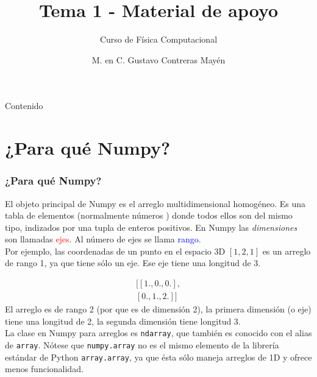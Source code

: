 \documentclass[12pt]{beamer}
\title{Tema 1 - Material de apoyo}
\subtitle{Curso de F\'{i}sica Computacional}
\author{M. en C. Gustavo Contreras May\'{e}n}
\begin{document}
\maketitle
\fontsize{14}{14}\selectfont
{}
\begin{frame}{Contenido}
\tableofcontents[pausesections]
\end{frame}
\section{¿Para qu\'{e} Numpy?}
\begin{frame}
\frametitle{¿Para qu\'{e} Numpy?}
El objeto principal de Numpy es el arreglo multidimensional homog\'{e}neo. Es una tabla de elementos (normalmente n\'{u}meros ) donde todos ellos son del mismo tipo, indizados por una tupla de enteros positivos. En Numpy las \textit{dimensiones} son llamadas \textcolor{red}{ejes}. Al n\'{u}mero de ejes se llama \textcolor{blue}{rango}.
\\
\bigskip
Por ejemplo, las coordenadas de un punto en el espacio 3D $[1,2,1]$ es un arreglo de rango 1, ya que tiene s\'{o}lo un eje. Ese eje tiene una longitud de 3.
\end{frame}
\begin{frame}
\[ \begin{split}
[[1., 0., 0.], \\
[0., 1., 2. ]]
\end{split} \]
El arreglo es de rango 2 (por que es de dimensi\'{o}n 2), la primera dimensi\'{o}n (o eje) tiene una longitud de 2, la segunda dimensi\'{o}n tiene longitud 3.
\\
\bigskip
La clase en Numpy para arreglos es \texttt{ndarray}, que tambi\'{e}n es conocido con el alias de \texttt{array}. N\'{o}tese que \texttt{numpy.array} no es el mismo elemento de la librer\'{i}a est\'{a}ndar de Python \texttt{array.array}, ya que \'{e}sta s\'{o}lo maneja arreglos de 1D y ofrece menos funcionalidad.
\end{frame}
\end{document}
